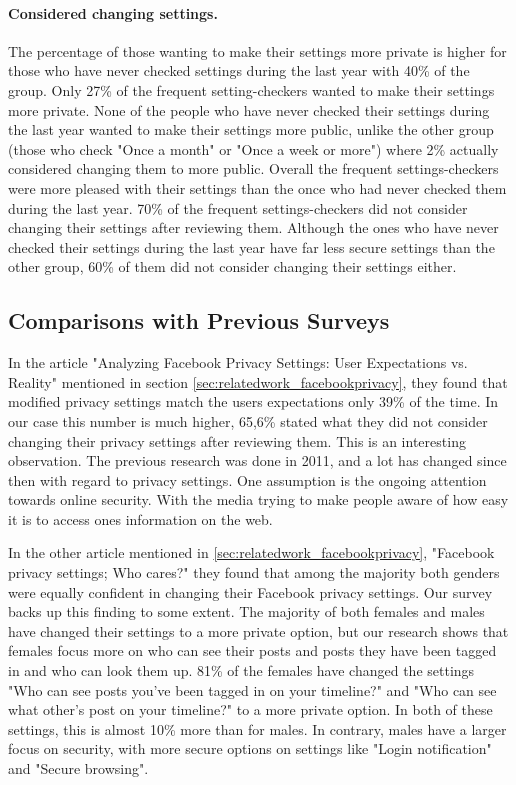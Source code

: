 \paragraph{Considered changing settings.}
The percentage of those wanting to make their settings more private is higher for those who have never checked settings during the last year with 40\% of the group. Only 27\% of the frequent setting-checkers wanted to make their settings more private. 
None of the people who have never checked their settings during the last year wanted to make their settings more public, unlike the other group (those who check "Once a month" or "Once a week or more") where 2\% actually considered changing them to more public. Overall the frequent settings-checkers were more pleased with their settings than the once who had never checked them during the last year. 70\% of the frequent settings-checkers did not consider changing their settings after reviewing them. Although the ones who have never checked their settings during the last year have far less secure settings than the other group, 60\% of them did not consider changing their settings either. 

\subsection{Comparisons with Previous Surveys} 
In the article "Analyzing Facebook Privacy Settings: User Expectations vs. Reality" mentioned in section \ref{sec:relatedwork_facebookprivacy}, they found that modified privacy settings match the users expectations only 39\% of the time. In our case this number is much higher, 65,6\% stated what they did not consider changing their privacy settings after reviewing them. This is an interesting observation. The previous research was done in 2011, and a lot has changed since then with regard to privacy settings. One assumption is the ongoing attention towards online security. With the media trying to make people aware of how easy it is to access ones information on the web. 

In the other article mentioned in \ref{sec:relatedwork_facebookprivacy}, "Facebook privacy settings; Who cares?" they found that among the majority both genders were equally confident in changing their Facebook privacy settings. Our survey backs up this finding to some extent. The majority of both females and males have changed their settings to a more private option, but our research shows that females focus more on who can see their posts and posts they have been tagged in and who can look them up. 81\% of the females have changed the settings "Who can see posts you've been tagged in on your timeline?" and "Who can see what other's post on your timeline?" to a more private option. In both of these settings, this is almost 10\% more than for males. In contrary, males have a larger focus on security, with more secure options on settings like "Login notification" and "Secure browsing". 

